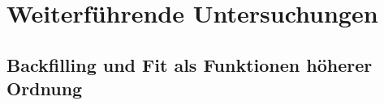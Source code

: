 \begin{figure}
\qquad
{}	


\end{figure}


\section{Weiterführende Untersuchungen}

\subsection{Backfilling und Fit als Funktionen höherer Ordnung}
\label{chap:higher-order}

